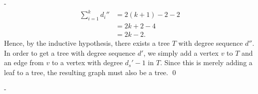 \documentclass[12pt]{article}
\makeatletter
\theoremstyle{ex215}
\newcounter{probcount}
\newlength\probsep
\newlength\pshrinking
\newenvironment{problems}%
  {\ifhmode\unskip\par\fi\setcounter{probcount}{0}\probsep\parskip
  \sbox\@tempboxa{\textbf{9.}}\pshrinking\wd\@tempboxa\advance\pshrinking\labelsep
  \advance\linewidth -\pshrinking
  \advance\@totalleftmargin\pshrinking
  \advance\leftskip\pshrinking}%
  {\ifhmode\unskip \par\fi\advance\leftskip-\pshrinking}%
\makeatother
\begin{document}
\begin{problems}
\begin{align*}
\sum\limits_{i=1}^{k}d_i''&=2(k+1)-2-2\\
&=2k+2-4\\
&=2k-2.
\end{align*}
Hence, by the inductive hypothesis, there exists a tree $T$ with degree sequence $d''$. In order to get a tree with degree sequence $d'$, we simply add a vertex $v$ to $T$ and an edge from $v$ to a vertex with degree $d_s'-1$ in $T$. Since this is merely adding a leaf to a tree, the resulting graph must also be a tree.
\qed
\end{problems}
\end{document}
